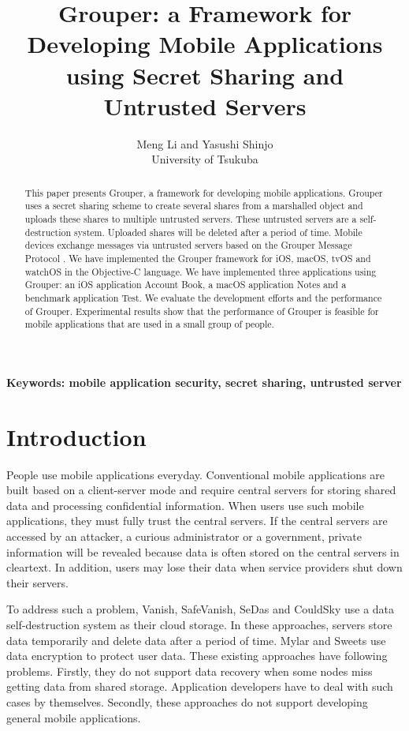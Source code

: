 \documentclass[twocolumn,10pt]{article}
\begin{document}
\title{\bf Grouper: a Framework for Developing Mobile Applications using Secret Sharing and Untrusted Servers}

\author{
	Meng Li and Yasushi Shinjo \\
	University of Tsukuba
}

\maketitle

\begin{abstract}

This paper presents Grouper, a framework for developing mobile applications.
Grouper uses a secret sharing scheme to create several shares from a marshalled object and uploads these shares to multiple untrusted servers. 
These untrusted servers are a self-destruction system.
Uploaded shares will be deleted after a period of time.
Mobile devices exchange messages via untrusted servers based on the Grouper Message Protocol . 
We have implemented the Grouper framework for iOS, macOS, tvOS and watchOS in the Objective-C language.
We have implemented three applications using Grouper: an iOS application Account Book, a macOS application Notes and a benchmark application Test.
We evaluate the development efforts and the performance of Grouper. 
Experimental results show that the performance of Grouper is feasible for mobile applications that are used in a small group of people.

\end{abstract}

\textbf{Keywords: mobile application security, secret sharing, untrusted server}

\section{Introduction}

People use mobile applications everyday. 
Conventional mobile applications are built based on a client-server mode and require central servers for storing shared data and processing confidential information.
When users use such mobile applications, they must fully trust the central servers.
If the central servers are accessed by an attacker, a curious administrator or a government, private information will be revealed because data is often stored on the central servers in cleartext. 
In addition, users may lose their data when service providers shut down their servers.

To address such a problem, Vanish\cite{geambasu2009vanish}, SafeVanish\cite{zeng2010safevanish}, SeDas\cite{zeng2012sedas} and CouldSky\cite{zeng2015cloudsky} use a data self-destruction system as their cloud storage.
In these approaches, servers store data temporarily and delete data after a period of time.
Mylar\cite{popa2014building} and Sweets\cite{sweets} use data encryption to protect user data.
These existing approaches have following problems.
Firstly, they do not support data recovery when some nodes miss getting data from shared storage.
Application developers have to deal with such cases by themselves.
Secondly, these approaches do not support developing general mobile applications.
\end{document}
